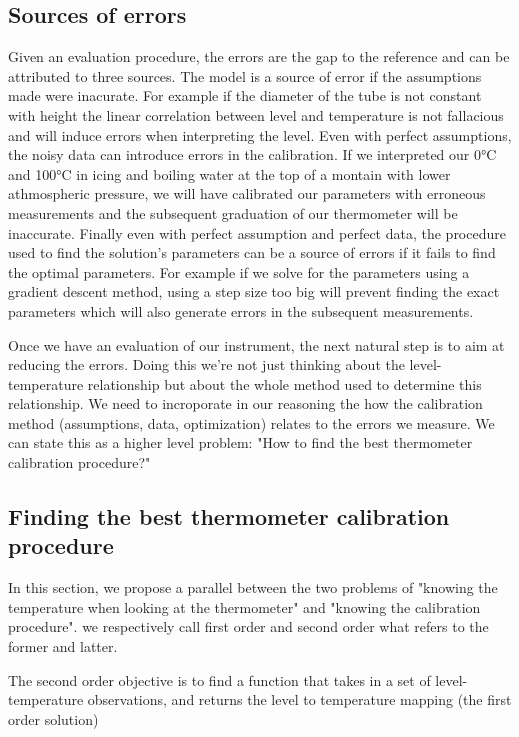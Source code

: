 \begin{bibunit}
 \subsection{Sources of errors}

Given an evaluation procedure, the errors are the gap to the reference and can be attributed to three sources.
 The model is a source of error if the assumptions made were inacurate. For example if the diameter of the tube is not constant with height the linear correlation between level and temperature is not fallacious and will induce errors when interpreting the level.
 Even with perfect assumptions, the noisy data can introduce errors in the calibration. If we interpreted our 0°C and 100°C in icing and boiling water at the top of a montain with lower athmospheric pressure, we will have calibrated our parameters with erroneous measurements and the subsequent graduation of our thermometer will be inaccurate.
 Finally even with perfect assumption and perfect data, the procedure used to find the solution's parameters can be a source of errors if it fails to find the optimal parameters. For example if we solve for the parameters using a gradient descent method, using a step size too big will prevent finding the exact parameters which will also generate errors in the subsequent measurements.


Once we have an evaluation of our instrument, the next natural step is to aim at reducing the errors. Doing this we're not just thinking about the level-temperature relationship but about the whole method used to determine this relationship. We need to incroporate in our reasoning the how the calibration method (assumptions, data, optimization) relates to the errors we measure. We can state this as a higher level problem: "How to find the best thermometer calibration procedure?"

\subsection{Finding the best thermometer calibration procedure}
In this section, we propose a parallel between the two problems of "knowing the temperature when looking at the thermometer" and  "knowing the calibration procedure". we respectively call first order and second order what refers to the former and latter.

  The second order objective is to find a function that takes in a set of level-temperature observations, and returns the level to temperature mapping (the first order solution)


\end{bibunit}
